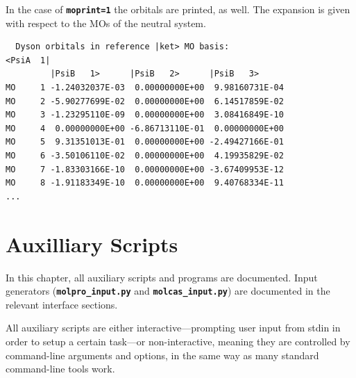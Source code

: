 \documentclass[a4paper,10pt,DIV=15,openany,twoside=false]{scrbook}
\newcommand{\ttt}[1]{\textbf{\texttt{#1}}}
\newenvironment{example}{
  \setlength{\OuterFrameSep}{3pt}
  \vspace{0mm}
  \definecolor{shadecolor}{HTML}{E4F4FF}
  \begin{shaded}
}{
  \end{shaded}
}
\begin{document}
In the case of \ttt{moprint=1} the orbitals are printed, as well.
The expansion is given with respect to the MOs of the neutral system.
%
\begin{example}
\begin{verbatim}
  Dyson orbitals in reference |ket> MO basis:                                   
<PsiA  1|                                                                       
         |PsiB   1>      |PsiB   2>      |PsiB   3>                             
MO     1 -1.24032037E-03  0.00000000E+00  9.98160731E-04                        
MO     2 -5.90277699E-02  0.00000000E+00  6.14517859E-02                        
MO     3 -1.23295110E-09  0.00000000E+00  3.08416849E-10                        
MO     4  0.00000000E+00 -6.86713110E-01  0.00000000E+00                        
MO     5  9.31351013E-01  0.00000000E+00 -2.49427166E-01                        
MO     6 -3.50106110E-02  0.00000000E+00  4.19935829E-02
MO     7 -1.83303166E-10  0.00000000E+00 -3.67409953E-12                        
MO     8 -1.91183349E-10  0.00000000E+00  9.40768334E-11 
...
\end{verbatim}
\end{example}
%














\chapter{Auxilliary Scripts}\label{chap:aux}

In this chapter, all auxiliary scripts and programs are documented. Input generators (\ttt{molpro\_input.py} and \ttt{molcas\_input.py}) are documented in the relevant interface sections.

All auxiliary scripts are either interactive---prompting user input from stdin in order to setup a certain task---or non-interactive, meaning they are controlled by command-line arguments and options, in the same way as many standard command-line tools work.
\end{document}
